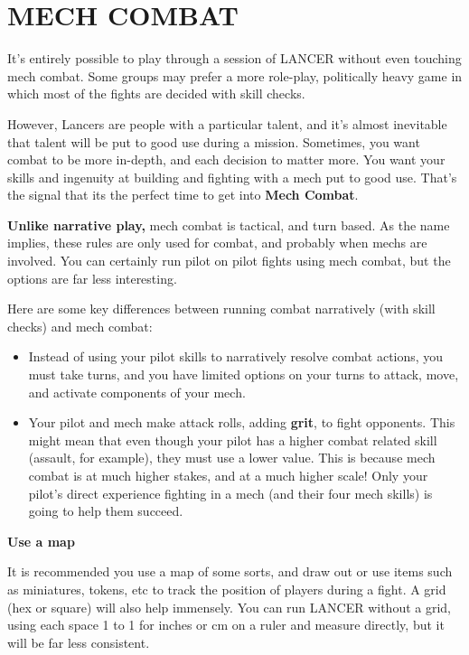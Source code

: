 \chapter{MECH COMBAT}
It’s entirely possible to play through a session of LANCER without even touching mech combat. Some groups may prefer a more role-play, politically heavy game in which most of the fights are decided with skill checks.

However, Lancers are people with a particular talent, and it’s almost inevitable that talent will be put to good use during a mission. Sometimes, you want combat to be more in-depth, and each decision to matter more. You want your skills and ingenuity at building and fighting with a mech put to good use. That’s the signal that its the perfect time to get into \textbf{Mech Combat}.

\textbf{Unlike narrative play,} mech combat is tactical, and turn based. As the name implies, these rules are only used for combat, and probably when mechs are involved. You can certainly run pilot on pilot fights using mech combat, but the options are far less interesting. 

Here are some key differences between running combat narratively (with skill checks) and mech combat:
\begin{itemize}
    \item Instead of using your pilot skills to narratively resolve combat actions, you must take turns, and you have limited options on your turns to attack, move, and activate components of your mech.
    \item Your pilot and mech make attack rolls, adding \textbf{grit}, to fight opponents. This might mean that even though your pilot has a higher combat related skill (assault, for example), they must use a lower value. This is because mech combat is at much higher stakes, and at a much higher scale! Only your pilot’s direct experience fighting in a mech (and their four mech skills) is going to help them succeed.
\end{itemize}

\begin{center}
\textbf{Use a map}
\end{center}

It is recommended you use a map of some sorts, and draw out or use items such as miniatures, tokens, etc to track the position of players during a fight. A grid (hex or square) will also help immensely. You can run LANCER without a grid, using each space 1 to 1 for inches or cm on a ruler and measure directly, but it will be far less consistent.

